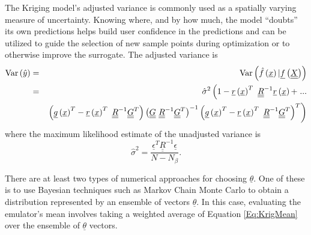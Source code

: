 \documentclass{article}
\begin{document}
The Kriging model's adjusted variance is commonly used as a spatially 
varying measure of uncertainty.  Knowing where, and by how much, the 
model ``doubts'' its own predictions helps build user confidence in 
the predictions and can be utilized to guide the selection of new 
sample points during optimization or to otherwise improve the 
surrogate.  The adjusted variance is
\begin{eqnarray*}
{\rm Var}\left(\hat{y}\right) &=& {\rm Var}\left(\hat{f}\left(\underline{x}\right)|\underline{f}\left(\underline{\underline{X}}\right)\right) \\ 
&=&\hat{\sigma}^2\left(1-\underline{r}\left(\underline{x}\right)^T\ \underline{\underline{R}}^{-1}\underline{r}\left(\underline{x}\right) + \right. ... \\
&&\left. \left(\underline{g}\left(\underline{x}\right)^T-\underline{r}\left(\underline{x}\right)^T\ \underline{\underline{R}}^{-1}\underline{\underline{G}}^T\right) \left(\underline{\underline{G}}\ \underline{\underline{R}}^{-1} \underline{\underline{G}}^T\right)^{-1}\left(\underline{g}\left(\underline{x}\right)^T-\underline{r}\left(\underline{x}\right)^T\ \underline{\underline{R}}^{-1}\underline{\underline{G}}^T\right)^T\right)
\end{eqnarray*}
where the maximum likelihood estimate of the unadjusted variance is
\begin{displaymath}
\hat{\sigma}^2=\frac{\underline{\epsilon}^T\underline{\underline{R}}^{-1}\underline{\epsilon}}{N-N_{\beta}}.
\end{displaymath}

There are at least two types of numerical approaches for choosing 
$\underline{\theta}$.  One of
these is to use Bayesian techniques such as Markov Chain Monte Carlo to
obtain a distribution represented by an ensemble of vectors 
$\underline{\theta}$.  In this case, evaluating the emulator's mean involves
taking a weighted average of Equation \ref{Eq:KrigMean} over the ensemble 
of $\underline{\theta}$ vectors.\newline
\end{document}
